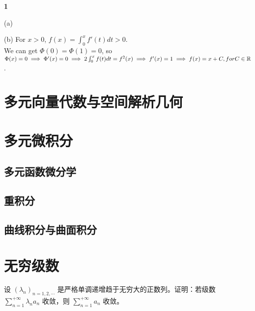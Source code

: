 \documentclass[12pt]{article}
\newenvironment{solution}[2][Solution]{\begin{trivlist}
\item[\hskip \labelsep {\bfseries #1}]}{\end{trivlist}}
\newenvironment{problem}[2][Problem]{\begin{trivlist}
\item[\hskip \labelsep {\bfseries #1}\hskip \labelsep {\bfseries #2.}]}{\end{trivlist}}
\begin{document}
\begin{solution}{1} \textbf{1}\\
    \item (a) 
    \item (b) For $x>0$, $f(x) = \int_{0}^{x} f'(t)dt > 0$. \\
        We can get $\Phi(0) = \Phi(1) = 0$, so $\Phi(x) = 0 \implies \Phi'(x) = 0 \implies 2\int_{0}^{x}f(t)dt = f^2 (x) \\
        \implies f'(x) = 1 \implies f(x) = x + C, for C \in \mathbb{R} $.
    
\end{solution}

\vspace{3cm}


\section{多元向量代数与空间解析几何}


\section{多元微积分}

\subsection{多元函数微分学}


\subsection{重积分}


\subsection{曲线积分与曲面积分}


\section{无穷级数}

\begin{problem}{1}
设 $(\lambda_n)_{n=1,2,\cdots}$ 是严格单调递增趋于无穷大的正数列。证明：若级数 $\displaystyle{ \sum_{n=1}^{+\infty}}\lambda_n a_n$ 收敛，则 $\displaystyle{\sum_{n=1}^{+\infty}}a_n$ 收敛。
\end{problem}
\end{document}
